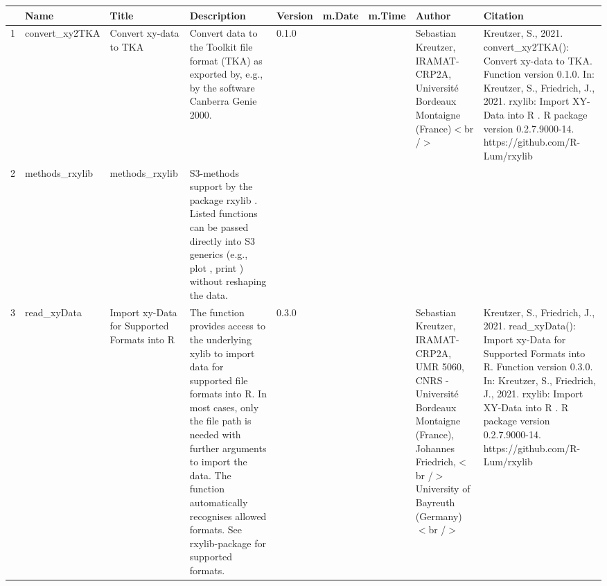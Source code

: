 \begin{table}[ht]
\centering
\begin{tabular}{rllllllll}
  \hline
 & Name & Title & Description & Version & m.Date & m.Time & Author & Citation \\ 
  \hline
1 & convert\_xy2TKA & Convert xy-data to TKA & Convert data to the Toolkit file format (TKA) as exported by, e.g., by the software Canberra Genie 2000. & 0.1.0
 &  &  & Sebastian Kreutzer, IRAMAT-CRP2A, Université Bordeaux Montaigne (France)$<$br /$>$ & Kreutzer, S., 2021. convert\_xy2TKA(): Convert xy-data to TKA. Function version 0.1.0. In: Kreutzer, S., Friedrich, J., 2021. rxylib: Import XY-Data into R . R package version 0.2.7.9000-14. https://github.com/R-Lum/rxylib
 \\ 
  2 & methods\_rxylib & methods\_rxylib & S3-methods support by the package  rxylib . Listed functions can be passed directly into S3 generics (e.g.,  plot ,  print ) without reshaping the data. &  &  &  &  &  \\ 
  3 & read\_xyData & Import xy-Data for Supported Formats into R & The function provides access to the underlying  xylib  to import data for supported file formats into R. In most cases, only the file path is needed with further arguments to import the data. The function automatically recognises allowed formats. See  rxylib-package  for supported formats. & 0.3.0
 &  &  & Sebastian Kreutzer, IRAMAT-CRP2A, UMR 5060, CNRS - Université Bordeaux Montaigne (France), Johannes Friedrich,$<$br /$>$ University of Bayreuth (Germany)$<$br /$>$ & Kreutzer, S., Friedrich, J., 2021. read\_xyData(): Import xy-Data for Supported Formats into R. Function version 0.3.0. In: Kreutzer, S., Friedrich, J., 2021. rxylib: Import XY-Data into R . R package version 0.2.7.9000-14. https://github.com/R-Lum/rxylib
 \\ 
   \hline
\end{tabular}
\end{table}

